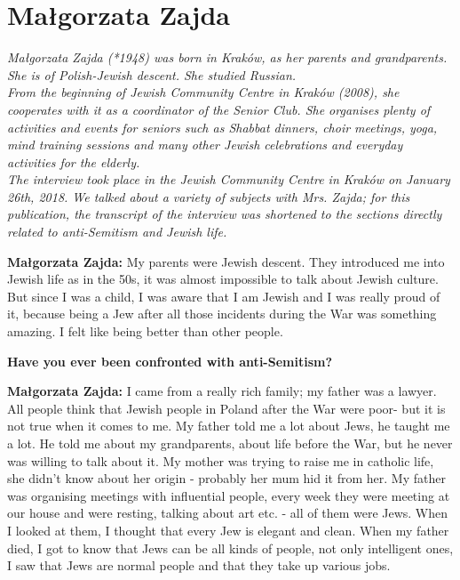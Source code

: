 \section{Małgorzata Zajda}

\textit{Małgorzata Zajda (*1948) was born in Kraków, as her parents and grandparents. She is of Polish-Jewish descent. She studied Russian.\\
From the beginning of Jewish Community Centre in Kraków (2008), she cooperates with it as a coordinator of the Senior Club. She organises plenty of activities and events for seniors such as Shabbat dinners, choir meetings, yoga, mind training sessions and many other Jewish celebrations and everyday activities for the elderly.\\
The interview took place in the Jewish Community Centre in Kraków on January 26th, 2018. We talked about a variety of subjects with Mrs. Zajda; for this publication, the transcript of the interview was shortened to the sections directly related to anti-Semitism and Jewish life. }\par 
\vspace*{2em}
\textbf{Małgorzata Zajda:} My parents were Jewish descent. They introduced me into Jewish life as in the 50s, it was almost impossible to talk about Jewish culture. But since I was a child, I was aware that I am Jewish and I was really proud of it, because being a Jew after all those incidents during the War was something amazing. I felt like being better than other people.  

\textbf{Have you ever been confronted with anti-Semitism?} 

\textbf{Małgorzata Zajda:} I came from a really rich family; my father was a lawyer. All people think that Jewish people in Poland after the War were poor- but it is not true when it comes to me. My father told me a lot about Jews, he taught me a lot. He told me about my grandparents, about life before the War, but he never was willing to talk about it. My mother was trying to raise me in catholic life, she didn't know about her origin - probably her mum hid it from her. My father was organising meetings with influential people, every week they were meeting at our house and were resting, talking about art etc. - all of them were Jews. When I looked at them, I thought that every Jew is elegant and clean. When my father died, I got to know that Jews can be all kinds of people, not only intelligent ones, I saw that Jews are normal people and that they take up various jobs. 

